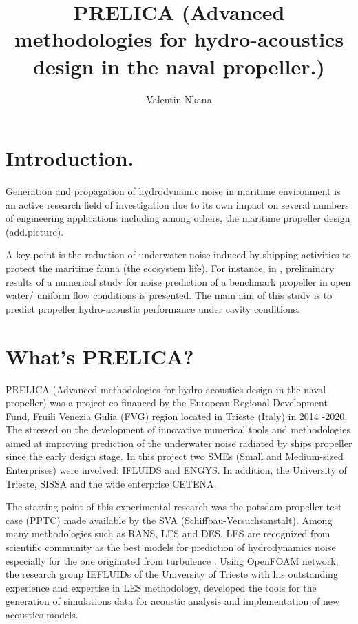\documentclass[10pt,a4paper,twoside]{article}
\author{Valentin Nkana}
\title{PRELICA (Advanced methodologies for hydro-acoustics design in the naval propeller.)}
\begin{document}
	
\maketitle
	
	
\section{Introduction.}

Generation and propagation of hydrodynamic noise in maritime environment is an active research field of investigation due to its own impact on several numbers of engineering applications including among others, the maritime propeller design (add.picture). 

A key point is the reduction of underwater noise induced by shipping activities to protect the maritime fauna (the ecosystem life). For instance, in \cite{sezen2020numerical}, preliminary results of a numerical study for noise prediction of a benchmark propeller in open water/ uniform flow conditions is presented. The main aim of this study is to predict propeller hydro-acoustic performance under cavity conditions.

\section{What's PRELICA?}

PRELICA (Advanced methodologies for hydro-acoustics design in the naval propeller) was a project co-financed by the European Regional Development Fund, Fruili Venezia Gulia (FVG) region located in Trieste (Italy) in 2014 -2020. The stressed on the development of innovative numerical tools and methodologies aimed at improving prediction of the underwater noise radiated by ships propeller since the early design stage. In this project two SMEs (Small and Medium-sized Enterprises) were involved: IFLUIDS and ENGYS. In addition, the University of Trieste, SISSA and the wide enterprise CETENA.


The starting point of this experimental research was the  potsdam propeller test case (PPTC) made available by the SVA (Schiffbau-Versuchsanstalt). Among many methodologies such as RANS, LES and DES. LES are recognized from scientific community as the best models for prediction of hydrodynamics noise especially for the one originated from  turbulence \cite{delafosse2008and}. Using OpenFOAM network, the research group IEFLUIDs of  the University of Trieste with his outstanding experience and expertise in LES methodology, developed the tools for the generation of simulations data for acoustic analysis and implementation of new acoustics models.  





\end{document}
